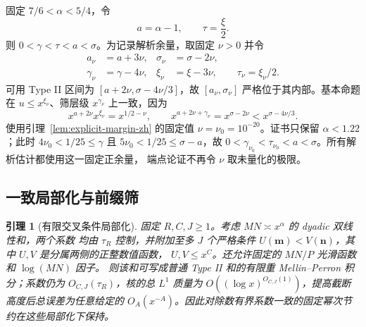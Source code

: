 \documentclass[UTF8,10pt,a4paper]{ctexart}
\newcommand{\1}{\mathbf{1}}
\newtheorem{lemma}[theorem]{引理}
\theoremstyle{remark}
\begin{document}
固定 $7/6<\alpha<5/4$，令
\[
 a=\alpha-1,\qquad \tau=\frac{\xi}{2}.
\]
则 $0<\gamma<\tau<a<\sigma$。为记录解析余量，取固定 $\nu>0$ 并令
\begin{equation}\label{eq:margin-parameters-zh}
\begin{aligned}
 a_\nu&=a+3\nu,& \sigma_\nu&=\sigma-2\nu,\\
 \gamma_\nu&=\gamma-4\nu,&
 \xi_\nu&=\xi-3\nu,\qquad \tau_\nu=\xi_\nu/2.
\end{aligned}
\end{equation}
可用 Type II 区间为 $[a+2\nu,\sigma-4\nu/3]$，故
$[a_\nu,\sigma_\nu]$ 严格位于其内部。基本命题在
$u\le x^{\xi_\nu}$、筛层级 $x^{\gamma_\nu}$ 上一致，因为
\[
 x^{a+2\nu}x^{\xi_\nu}=x^{1/2-\nu},
 \qquad
 x^{a+2\nu+\gamma_\nu}=x^{\sigma-2\nu}
 <x^{\sigma-4\nu/3}.
\]
使用引理~\ref{lem:explicit-margin-zh} 的固定值
$\nu=\nu_0=10^{-20}$。证书只保留 $\alpha<1.22$；此时
$4\nu_0<1/25\le\gamma$ 且 $5\nu_0<1/25\le\sigma-a$，故
$0<\gamma_{\nu_0}<\tau_{\nu_0}<a<\sigma$。所有解析估计都使用这一固定正余量，
端点论证不再令 $\nu$ 取未量化的极限。

\subsection{一致局部化与前缀筛}

\begin{lemma}[有限交叉条件局部化]\label{lem:localization-zh}
固定 $R,C,J\ge1$。考虑 $MN\asymp x^\alpha$ 的 dyadic 双线性和，两个系数
均由 $\tau_R$ 控制，并附加至多 $J$ 个严格条件
$U(\boldsymbol m)<V(\boldsymbol n)$，其中 $U,V$ 是分属两侧的正整数值函数，
$U,V\le x^C$。还允许固定的 $MN/P$ 光滑函数和 $\log(MN)$ 因子。
则该和可写成普通 Type II 和的有限重 Mellin--Perron 积分；系数仍为
$O_{C,J}(\tau_R)$，核的总 $L^1$ 质量为
$O((\log x)^{O_{C,J}(1)})$，提高截断高度后总误差为任意给定的
$O_A(x^{-A})$。因此对除数有界系数一致的固定幂次节约在这些局部化下保持。
\end{lemma}
\end{document}
